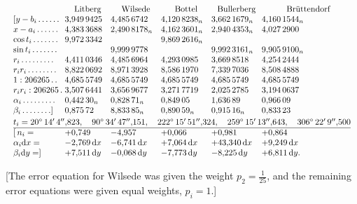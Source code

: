 \[
\resizebox{\linewidth}{!}{\(\begin{array}{@{}l@{\;}l@{\quad}l@{\quad}l@{\quad}l@{\quad}l@{}}
 &\multicolumn{1}{c}{\text{Litberg}}
 &\multicolumn{1}{c}{\text{Wilsede}}
 &\multicolumn{1}{c}{\text{Bottel}}
 &\multicolumn{1}{c}{\text{Bullerberg}}
 &\multicolumn{1}{c@{}}{\text{Brüttendorf}}\\
 {[}y-b_i\,.\,.\,.\,.\,.\,.&3{,}949\,9425&4{,}485\,6742&4{,}120\,8238_{n}&3{,}662\,1679_{n}&4{,}160\,1544_{n}\\
 x-a_i\,.\,.\,.\,.\,.\,.&4{,}383\,3688&2{,}490\,8178_{n}&4{,}162\,3601_{n}&2{,}940\,4353_{n}&4{,}027\,2900\\
 \cos t_i\,.\,.\,.\,.\,.\,.\,.&9{,}972\,3342&&9{,}869\,2616_{n}&&\\
 \sin t_i\,.\,.\,.\,.\,.\,.\,.&&9{,}999\,9778&&9{,}992\,3161_{n}&9{,}905\,9100_{n}\\
 r_i\,.\,.\,.\,.\,.\,.\,.\,.\,.&4{,}411\,0346&4{,}485\,6964&4{,}293\,0985&3{,}669\,8518&4{,}254\,2444\\
 r_ir_i\,.\,.\,.\,.\,.\,.\,.\,.&8{,}822\,0692&8{,}971\,3928&8{,}586\,1970&7{,}339\,7036&8{,}508\,4888\\
 1:206265\,.\,.&4{,}685\,5749&4{,}685\,5749&4{,}685\,5749&4{,}685\,5749&4{,}685\,5749\\
 r_ir_i:206265\,.&3{,}507\,6441&3{,}656\,9677&3{,}271\,7719&2{,}025\,2785&3{,}194\,0637\\
 \alpha_i\,.\,.\,.\,.\,.\,.\,.\,.\,.&0{,}442\,30_{n}&0{,}828\,71_{n}&0{,}849\,05&1{,}636\,89&0{,}966\,09\\
 \beta_i\,.\,.\,.\,.\,.\,.\,.\,.]&0{,}875\,72&8{,}833\,85_{n}&0{,}890\,59_{n}&0{,}915\,16_{n}&0{,}833\,23
\\[2pt]
 \multicolumn{6}{@{}l@{}}{t_i=20^\circ\,14'\,4''{,}823,\quad
 90^\circ\,34'\,47''{,}151,\quad222^\circ\,15'\,51''{,}324,\quad
 259^\circ\,15'\,13''{,}643,\quad306^\circ\,22'\,9''{,}500}\\
 \hline
 [\,n_i=&+0{,}749&-4{,}957&+0{,}066&+0{,}981&+0{,}864\\
 \alpha_i\mathrm{d}x=&-2{,}769\,\mathrm{d}x&-6{,}741\,\mathrm{d}x&+7{,}064\,\mathrm{d}x&+43{,}340\,\mathrm{d}x&+9{,}249\,\mathrm{d}x\\
 \beta_i\mathrm{d}y=]&+7{,}511\,\mathrm{d}y&-0{,}068\,\mathrm{d}y&-7{,}773\,\mathrm{d}y&-8{,}225\,\mathrm{d}y&+6{,}811\,\mathrm{d}y.
\end{array}\)}
\]

[The error equation for Wilsede was given the weight \(p_2=\tfrac1{25}\), and the remaining error equations were given equal weights, \(p_i=1\).]

